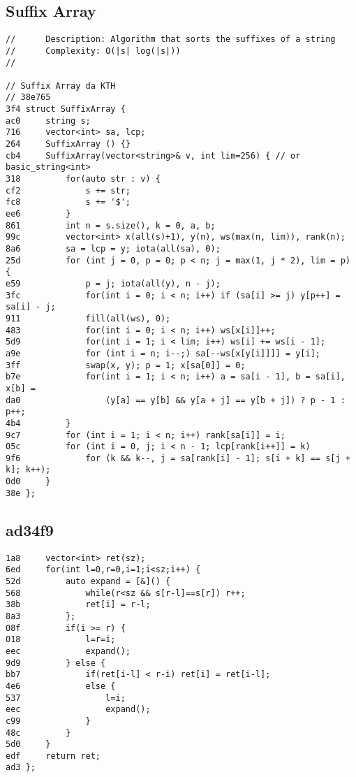 \documentclass[11pt, a4paper, twoside]{article}
\begin{document}
\subsection{     Suffix Array}
\begin{lstlisting}
//      Description: Algorithm that sorts the suffixes of a string
//      Complexity: O(|s| log(|s|))
//

// Suffix Array da KTH
// 38e765
3f4 struct SuffixArray {
ac0     string s;
716     vector<int> sa, lcp;
264     SuffixArray () {}
cb4     SuffixArray(vector<string>& v, int lim=256) { // or basic_string<int>
318         for(auto str : v) {
cf2             s += str;
fc8             s += '$';
ee6         }
861         int n = s.size(), k = 0, a, b;
99c         vector<int> x(all(s)+1), y(n), ws(max(n, lim)), rank(n);
8a6         sa = lcp = y; iota(all(sa), 0);
25d         for (int j = 0, p = 0; p < n; j = max(1, j * 2), lim = p) {
e59             p = j; iota(all(y), n - j);
3fc             for(int i = 0; i < n; i++) if (sa[i] >= j) y[p++] = sa[i] - j;
911             fill(all(ws), 0);
483             for(int i = 0; i < n; i++) ws[x[i]]++;
5d9             for(int i = 1; i < lim; i++) ws[i] += ws[i - 1];
a9e             for (int i = n; i--;) sa[--ws[x[y[i]]]] = y[i];
3ff             swap(x, y); p = 1; x[sa[0]] = 0;
b7e             for(int i = 1; i < n; i++) a = sa[i - 1], b = sa[i], x[b] =
da0                 (y[a] == y[b] && y[a + j] == y[b + j]) ? p - 1 : p++;
4b4         }
9c7         for (int i = 1; i < n; i++) rank[sa[i]] = i;
05c         for (int i = 0, j; i < n - 1; lcp[rank[i++]] = k)
9f6             for (k && k--, j = sa[rank[i] - 1]; s[i + k] == s[j + k]; k++);
0d0     }
38e };
\end{lstlisting}

\subsection{ad34f9}
\begin{lstlisting}
1a8 	vector<int> ret(sz);
6ed 	for(int l=0,r=0,i=1;i<sz;i++) {
52d 		auto expand = [&]() {
568 			while(r<sz && s[r-l]==s[r]) r++;
38b 			ret[i] = r-l;
8a3 		};
08f 		if(i >= r) {
018 			l=r=i;
eec 			expand();
9d9 		} else {
bb7 			if(ret[i-l] < r-i) ret[i] = ret[i-l];
4e6 			else {
537 				l=i;
eec 				expand();
c99 			}
48c 		}
5d0 	}
edf 	return ret;
ad3 };
\end{lstlisting}



%
%
\end{document}
